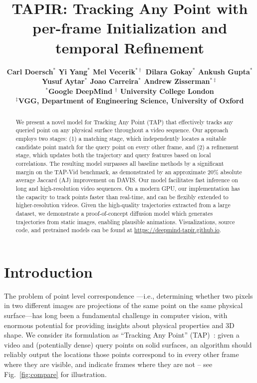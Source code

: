 \documentclass[10pt,twocolumn,letterpaper]{article}
\begin{document}
\title{TAPIR: Tracking Any Point with per-frame Initialization and temporal Refinement}

\author{
   \bf Carl Doersch$^{*}$ \qquad Yi Yang$^{*}$ \qquad Mel Vecerik$^{*\dagger}$ \qquad Dilara Gokay$^{*}$ \qquad Ankush Gupta$^{*}$ \\
   \bf Yusuf Aytar$^{*}$ \qquad Joao Carreira$^{*}$ \qquad Andrew Zisserman$^{*\ddagger}$ \\
    $^{*}$Google DeepMind \qquad $^{\dagger}$ University College London \\
    $^{\ddagger}$VGG, Department of Engineering Science, University of Oxford
}

\maketitle
\ificcvfinal\thispagestyle{empty}\fi

\begin{abstract}
We present a novel model for Tracking Any Point (TAP) that effectively tracks any queried point on any physical surface throughout a video sequence. Our approach employs two stages: (1) a matching stage, which independently locates a suitable candidate point match for the query point on every other frame, and (2) a refinement stage, which updates both the trajectory and query features based on local correlations. The resulting model surpasses all baseline methods by a significant margin on the TAP-Vid benchmark, as demonstrated by an approximate 20\% absolute average Jaccard (AJ) improvement on DAVIS. Our model facilitates fast inference on long and high-resolution video sequences.  On a modern GPU, our implementation has the capacity to track points faster than real-time, and can be flexibly extended to higher-resolution videos.
Given the high-quality trajectories extracted from a large dataset, we demonstrate a proof-of-concept diffusion model which generates trajectories from static images, enabling plausible animations.
Visualizations, source code, and pretrained models can be found at \url{https://deepmind-tapir.github.io}. \end{abstract}

\section{Introduction}

The problem of point level correspondence ---i.e., determining whether two pixels in two different images are projections of the same point on the same physical surface---has long been a fundamental challenge in computer vision, with enormous potential for providing insights about physical properties and 3D shape. We consider its formulation as  ``Tracking Any Point'' (TAP)~\cite{doersch2022tap}: given a video and (potentially dense) query points on solid surfaces, an algorithm should reliably output the locations those points correspond to in every other frame where they are visible, and indicate frames where they are not -- see Fig.~\ref{fig:compare} for illustration.
\end{document}
